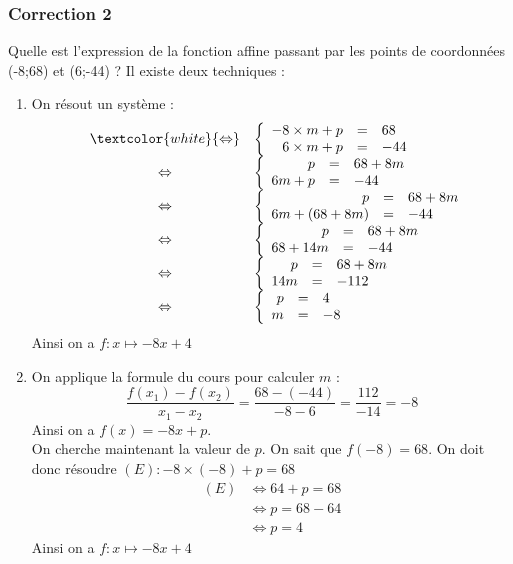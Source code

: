 \documentclass[15pt, mathserif]{beamer}
\begin{document}
\begin{frame}
\vspace{-10mm}
	\frametitle{Correction 2}
\vspace*{1cm} 
 \footnotesize{Quelle est l'expression de la fonction affine passant par les points de coordonnées (-8;68) et (6;-44) ? Il existe deux techniques :} 
 \begin{multicols}{2} 
 \begin{enumerate} 
 \item On résout un système : $$ \begin{array}{rcl} 
 & \textcolor{white}{\Leftrightarrow} & 
 \left 
 \{\begin{array}{rcl}-8\times m + p&=&68 \\ 
 6\times m+p&=&-44\end{array} \right. \\ 
 &\Leftrightarrow & \left 
 \{\begin{array}{rcl} p&=&68+8m \\ 
 6m+p&=&-44\end{array} \right. \\ 
 &\Leftrightarrow & \left 
 \{\begin{array}{rcl} p&=&68+8m \\ 
 6m+(68+8m) &=&-44\end{array} \right. \\ &\Leftrightarrow& \left \{\begin{array}{rcl}p&=&68+8m \\ 
 68+14m&=&-44\end{array} \right. \\ &\Leftrightarrow& \left \{\begin{array}{rcl}p&=&68+8m \\ 
 14m&=&-112\end{array} \right. \\  &\Leftrightarrow& \left \{\begin{array}{rcl} p&=&4 \\  m&=&-8\end{array}\right. \end{array}$$ 
 Ainsi on a $f:x\mapsto -8x+4$ 
 \columnbreak 
 \item 
 \footnotesize{On applique la formule du cours pour calculer $m$ :$$ \dfrac{f(x_1)-f(x_2)}{x_1-x_2}=\dfrac{68-\left(-44\right)}{-8-6}= \dfrac{112}{-14}=-8$$} \footnotesize{ Ainsi on a $f(x)= -8x +p $. 
  \\ On cherche maintenant la valeur de $p$. On sait que $f(-8)=68$. On doit donc résoudre $(E): -8\times\left(-8\right)+p=68$}	 
 \begin{align*} (E)& \Leftrightarrow 64+p=68\\
		 	 & \Leftrightarrow p=68-64\\
			 & \Leftrightarrow p=4
	 \end{align*} 
 Ainsi on a $f:x\mapsto -8x+4$ 
 \end{enumerate} 
 \end{multicols} 
 \end{frame}
\end{document}
